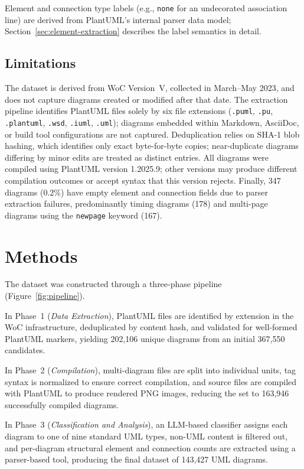 \documentclass[11pt]{article}
\begin{document}
\noindent Element and connection type labels (e.g., \texttt{none} for an undecorated association line) are derived from PlantUML's internal parser data model; Section~\ref{sec:element-extraction} describes the label semantics in detail.

\subsection{Limitations}
\label{sec:limitations}

The dataset is derived from WoC Version~V, collected in March--May 2023, and does not capture diagrams created or modified after that date. The extraction pipeline identifies PlantUML files solely by six file extensions (\texttt{.puml}, \texttt{.pu}, \texttt{.plantuml}, \texttt{.wsd}, \texttt{.iuml}, \texttt{.uml}); diagrams embedded within Markdown, AsciiDoc, or build tool configurations are not captured. Deduplication relies on SHA-1 blob hashing, which identifies only exact byte-for-byte copies; near-duplicate diagrams differing by minor edits are treated as distinct entries. All diagrams were compiled using PlantUML version 1.2025.9; other versions may produce different compilation outcomes or accept syntax that this version rejects. Finally, 347 diagrams (0.2\%) have empty element and connection fields due to parser extraction failures, predominantly timing diagrams (178) and multi-page diagrams using the \texttt{newpage} keyword (167).


\section{Methods}
\label{sec:methods}

The dataset was constructed through a three-phase pipeline (Figure~\ref{fig:pipeline}).

In Phase~1 (\emph{Data Extraction}), PlantUML files are identified by extension in the WoC infrastructure, deduplicated by content hash, and validated for well-formed PlantUML markers, yielding 202,106 unique diagrams from an initial 367,550 candidates.

In Phase~2 (\emph{Compilation}), multi-diagram files are split into individual units, tag syntax is normalized to ensure correct compilation, and source files are compiled with PlantUML to produce rendered PNG images, reducing the set to 163,946 successfully compiled diagrams.

In Phase~3 (\emph{Classification and Analysis}), an LLM-based classifier assigns each diagram to one of nine standard UML types, non-UML content is filtered out, and per-diagram structural element and connection counts are extracted using a parser-based tool, producing the final dataset of 143,427 UML diagrams.
\end{document}

